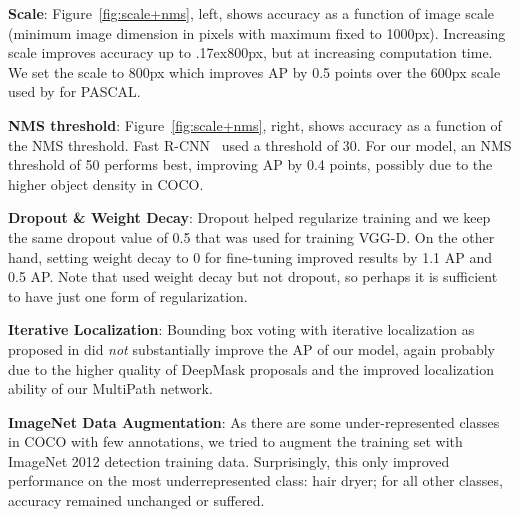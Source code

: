 \documentclass{bmvc2k}
\newcommand{\app}{\raise.17ex\hbox{}}
\newcommand{\AP}[1]{AP\xspace}
\newcommand{\fig}[1]{Figure~\ref{fig:#1}}
\begin{document}
\textbf{Scale}: \fig{scale+nms}, left, shows accuracy as a function of image scale (minimum image dimension in pixels with maximum fixed to 1000px). Increasing scale improves accuracy up to \app800px, but at increasing computation time. We set the scale to 800px which improves AP by 0.5 points over the 600px scale used by \cite{girshick15fastrcnn} for PASCAL.

\textbf{NMS threshold}: \fig{scale+nms}, right, shows accuracy as a function of the NMS threshold. Fast R-CNN~\cite{girshick15fastrcnn} used a threshold of 30. For our model, an NMS threshold of 50 performs best, improving AP by 0.4 points, possibly due to the higher object density in COCO.

\textbf{Dropout \& Weight Decay}: Dropout helped regularize training and we keep the same dropout value of 0.5 that was used for training VGG-D. On the other hand, setting weight decay to 0 for fine-tuning improved results by 1.1 \AP{50} and 0.5 AP. Note that \cite{bell15ion} used weight decay but not dropout, so perhaps it is sufficient to have just one form of regularization.

\textbf{Iterative Localization}: Bounding box voting with iterative localization as proposed in \cite{gidaris2015object} did \emph{not} substantially improve the AP of our model, again probably due to the higher quality of DeepMask proposals and the improved localization ability of our MultiPath network.

\textbf{ImageNet Data Augmentation}: As there are some under-represented classes in COCO with few annotations, we tried to augment the training set with ImageNet 2012 detection training data. Surprisingly, this only improved performance on the most underrepresented class: hair dryer; for all other classes, accuracy remained unchanged or suffered.


\end{document}
